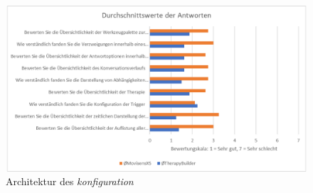 \begin{figure}[h]
\centering
\includegraphics[width=1\textwidth]{pictures/diagramme/antwortendurchsch2}
\caption{Architektur des \emph{konfiguration}}
\label{antwortendurchsch2}
\end{figure}





